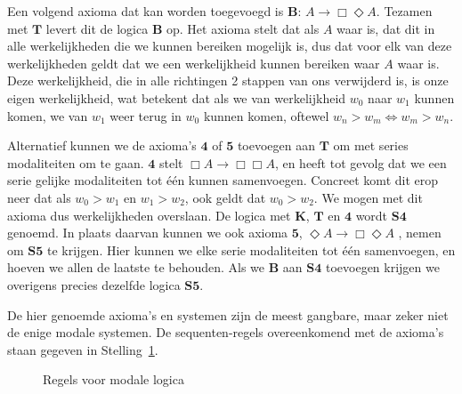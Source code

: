 Een volgend axioma dat kan worden toegevoegd is $\mathbf{B}$: $A \to \Box \Diamond A$. Tezamen met $\mathbf{T}$ levert dit de logica $\mathbf{B}$ op. Het axioma stelt dat als $A$ waar is, dat dit in alle werkelijkheden die we kunnen bereiken mogelijk is, dus dat voor elk van deze werkelijkheden geldt dat we een werkelijkheid kunnen bereiken waar $A$ waar is. Deze werkelijkheid, die in alle richtingen 2 stappen van ons verwijderd is, is onze eigen werkelijkheid, wat betekent dat als we van werkelijkheid $w_0$ naar $w_1$ kunnen komen, we van $w_1$ weer terug in $w_0$ kunnen komen, oftewel $w_n > w_m \iff w_m > w_n$.

Alternatief kunnen we de axioma's $\mathbf{4}$ of $\mathbf{5}$ toevoegen aan $\mathbf{T}$ om met series modaliteiten om te gaan. $\mathbf{4}$ stelt $\Box A \to \Box \Box A$, en heeft tot gevolg dat we een serie gelijke modaliteiten tot \'e\'en kunnen samenvoegen. Concreet komt dit erop neer dat als $w_0 > w_1$ en $w_1 > w_2$, ook geldt dat $w_0 > w_2$. We mogen met dit axioma dus werkelijkheden overslaan. De logica met $\mathbf{K}$, $\mathbf{T}$ en $\mathbf{4}$ wordt $\mathbf{S4}$ genoemd. In plaats daarvan kunnen we ook axioma $\mathbf{5}$, $\Diamond A \to \Box \Diamond A$ , nemen om $\mathbf{S5}$ te krijgen. Hier kunnen we elke serie modaliteiten tot \'e\'en samenvoegen, en hoeven we allen de laatste te behouden. Als we $\mathbf{B}$ aan $\mathbf{S4}$ toevoegen krijgen we overigens precies dezelfde logica $\mathbf{S5}$.

De hier genoemde axioma's en systemen zijn de meest gangbare, maar zeker niet de enige modale systemen. De sequenten-regels overeenkomend met de axioma's staan gegeven in Stelling~\ref{th:sq-modal}.

\begin{figure}[ht]
\begin{theorem}\label{th:sq-modal} Regels voor modale logica
\mbox{}\\[3mm]
\hspace{5mm}
 \\

\vspace{4mm}

\hspace{5mm}
\end{theorem}
\end{figure}
